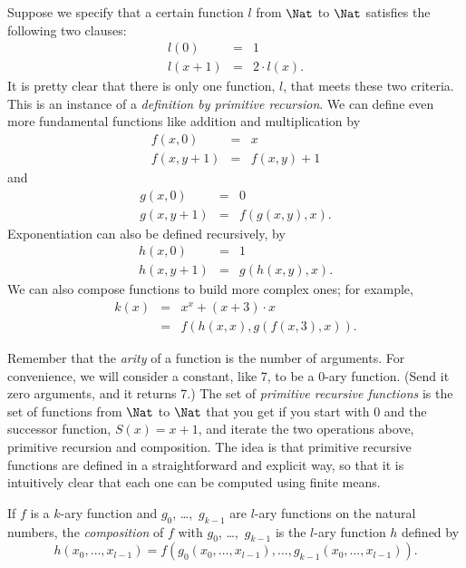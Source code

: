 \documentclass[../../include/open-logic-section]{subfiles}
\begin{document}

\begin{explain}
Suppose we specify that a certain function $l$ from $\Nat$ to $\Nat$
satisfies the following two clauses:
\begin{eqnarray*}
l(0) & = & 1 \\
l(x+1) & = & 2 \cdot l(x).
\end{eqnarray*}
It is pretty clear that there is only one function, $l$, that meets
these two criteria. This is an instance of a \emph{definition by
  primitive recursion}. We can define even more fundamental functions
like addition and multiplication by
\begin{eqnarray*}
f(x,0) & = & x \\
f(x,y+1) & = & f(x,y)+1
\end{eqnarray*}
and
\begin{eqnarray*}
g(x,0) & = & 0 \\
g(x,y+1) & = & f(g(x,y),x).
\end{eqnarray*}
Exponentiation can also be defined recursively, by
\begin{eqnarray*}
h(x,0) & = & 1 \\
h(x,y+1) & = & g(h(x,y),x).
\end{eqnarray*}
We can also compose functions to build more complex ones; for example,
\begin{eqnarray*}
k(x) & = & x^x + (x + 3) \cdot x \\
& = & f(h(x,x),g(f(x,3),x)).
\end{eqnarray*}

Remember that the \emph{arity} of a function is the number of
arguments. For convenience, we will consider a constant, like 7, to be
a 0-ary function. (Send it zero arguments, and it returns 7.)  The set
of \emph{primitive recursive functions} is the set of functions from
$\Nat$ to $\Nat$ that you get if you start with $0$ and the successor
function, $S(x) = x+1$, and iterate the two operations above,
primitive recursion and composition. The idea is that primitive
recursive functions are defined in a straightforward and explicit
way, so that it is intuitively clear that each one can be computed
using finite means.
\end{explain}

\begin{defn}
If $f$ is a $k$-ary function and $g_0$, \dots,~$g_{k-1}$ are $l$-ary
functions on the natural numbers, the \emph{composition} of $f$ with
$g_0$, \dots,~$g_{k-1}$ is the $l$-ary function $h$ defined by
\[
h(x_0,\dots,x_{l-1}) =
f(g_0(x_0,\dots,x_{l-1}),\dots,g_{k-1}(x_0,\dots,x_{l-1})) .
\]
\end{defn}
\end{document}
